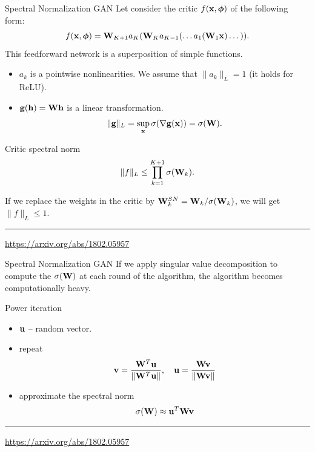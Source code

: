 \begin{frame}{Spectral Normalization GAN}
	Let consider the critic $f(\mathbf{x}, \boldsymbol{\phi})$ of the following form:
	\[
		f(\mathbf{x}, \boldsymbol{\phi}) = \mathbf{W}_{K+1} a_K (\mathbf{W}_K a_{K-1}(\dots a_1(\mathbf{W}_1 \mathbf{x}) \dots)).
	\]
	This feedforward network is a superposition of simple functions.
	\begin{itemize}
		\item $a_k$ is a pointwise nonlinearities. We assume that $\| a_k \|_L = 1$ (it holds for ReLU).
		\item $\mathbf{g}(\mathbf{h}) = \mathbf{W} \mathbf{h}$ is a linear transformation.
		\[
			\| \mathbf{g} \|_L = \sup_{\mathbf{x}} \sigma( \nabla \mathbf{g}(\mathbf{x})) = \sigma(\mathbf{W}).
		\]
	\end{itemize}
	\vspace{-0.5cm}
	\begin{block}{Critic spectral norm}
		\vspace{-0.5cm}
		\[
			\| f \|_L \leq \prod_{k=1}^{K+1} \sigma(\mathbf{W}_k).
		\]
	\end{block}
	If we replace the weights in the critic by $\mathbf{W}^{SN}_k = \mathbf{W}_k / \sigma(\mathbf{W}_k)$, we will get $\| f\|_L \leq 1.$ \\
	
	\vspace{0.1cm}
	\vfill
	\hrule\medskip 
	{\scriptsize \href{https://arxiv.org/abs/1802.05957}{https://arxiv.org/abs/1802.05957}}
\end{frame}
\begin{frame}{Spectral Normalization GAN}
	 If we apply singular value decomposition to compute the $\sigma(\mathbf{W})$ at each round of the algorithm, the algorithm becomes computationally heavy.
	 \begin{block}{Power iteration}
	 	\begin{itemize}
	 		\item $\mathbf{u}$ -- random vector.
	 		\item repeat
	 		\[
	 			\mathbf{v} = \frac{\mathbf{W}^T \mathbf{u}}{\| \mathbf{W}^T \mathbf{u} \|}, \quad \mathbf{u} = \frac{\mathbf{W} \mathbf{v}}{\| \mathbf{W} \mathbf{v} \|}
	 		\]
	 		\item approximate the spectral norm
	 		\[
	 			\sigma(\mathbf{W}) \approx \mathbf{u}^T \mathbf{W} \mathbf{v}
	 		\]
	 	\end{itemize}
	 \end{block}
	\vfill
	\hrule\medskip 
	{\scriptsize \href{https://arxiv.org/abs/1802.05957}{https://arxiv.org/abs/1802.05957}}
\end{frame}

